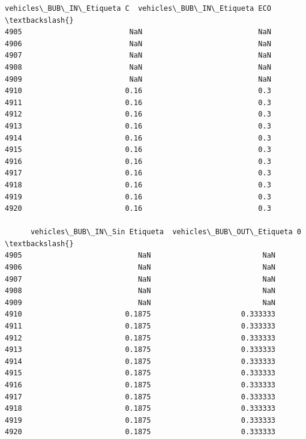\documentclass[11pt]{article}
\begin{document}
\begin{tcolorbox}[breakable, size=fbox, boxrule=.5pt, pad at break*=1mm, opacityfill=0]
\begin{Verbatim}[commandchars=\\\{\}]
      vehicles\_BUB\_IN\_Etiqueta C  vehicles\_BUB\_IN\_Etiqueta ECO  \textbackslash{}
4905                         NaN                           NaN
4906                         NaN                           NaN
4907                         NaN                           NaN
4908                         NaN                           NaN
4909                         NaN                           NaN
4910                        0.16                           0.3
4911                        0.16                           0.3
4912                        0.16                           0.3
4913                        0.16                           0.3
4914                        0.16                           0.3
4915                        0.16                           0.3
4916                        0.16                           0.3
4917                        0.16                           0.3
4918                        0.16                           0.3
4919                        0.16                           0.3
4920                        0.16                           0.3

      vehicles\_BUB\_IN\_Sin Etiqueta  vehicles\_BUB\_OUT\_Etiqueta 0  \textbackslash{}
4905                           NaN                          NaN
4906                           NaN                          NaN
4907                           NaN                          NaN
4908                           NaN                          NaN
4909                           NaN                          NaN
4910                        0.1875                     0.333333
4911                        0.1875                     0.333333
4912                        0.1875                     0.333333
4913                        0.1875                     0.333333
4914                        0.1875                     0.333333
4915                        0.1875                     0.333333
4916                        0.1875                     0.333333
4917                        0.1875                     0.333333
4918                        0.1875                     0.333333
4919                        0.1875                     0.333333
4920                        0.1875                     0.333333


\end{Verbatim}
\end{tcolorbox}
\end{document}
